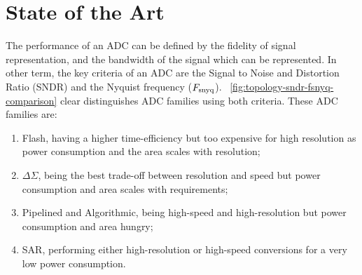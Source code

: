 
\chapter{State of the Art}
\label{sec:soa}
\ifpdf
    \graphicspath{{Chapter2/Figs/Raster/}{Chapter2/Figs/PDF/}{Chapter2/Figs/}}
\else
    \graphicspath{{Chapter2/Figs/Vector/}{Chapter2/Figs/}}
\fi
{}
The performance of an ADC can be defined by the fidelity of signal representation, and the bandwidth of the signal which can be represented. In other term, the key criteria of an ADC are the Signal to Noise and Distortion Ratio (SNDR) and the Nyquist frequency ($F_{\rm snyq}$). \figurename~\ref{fig:topology-sndr-fsnyq-comparison} clear distinguishes ADC families using both criteria. These ADC families are:
\begin{enumerate}
	\item Flash, having a higher time-efficiency but too expensive for high resolution as power consumption and the area scales with resolution;
	\item $\Delta\Sigma$, being the best trade-off between resolution and speed but power consumption and area scales with requirements;
	\item Pipelined and Algorithmic, being high-speed and high-resolution but power consumption and area hungry;
	\item SAR, performing either high-resolution or high-speed conversions for a very low power consumption.
\end{enumerate}

